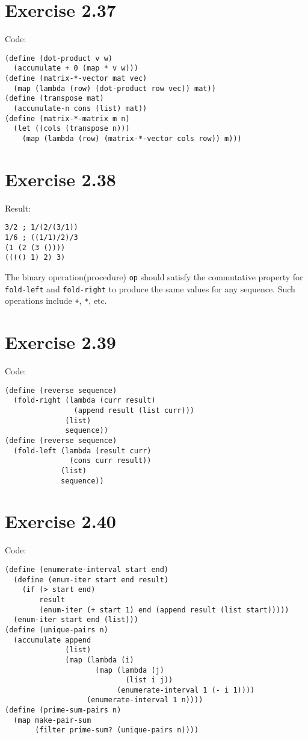 \documentclass[../main.tex]{subfiles}
\begin{document}
\section{Exercise 2.37}

Code:

\begin{lstlisting}
(define (dot-product v w)
  (accumulate + 0 (map * v w)))
(define (matrix-*-vector mat vec)
  (map (lambda (row) (dot-product row vec)) mat))
(define (transpose mat)
  (accumulate-n cons (list) mat))
(define (matrix-*-matrix m n)
  (let ((cols (transpose n)))
    (map (lambda (row) (matrix-*-vector cols row)) m)))
\end{lstlisting}

\section{Exercise 2.38}

Result:

\begin{lstlisting}
3/2 ; 1/(2/(3/1))
1/6 ; ((1/1)/2)/3
(1 (2 (3 ())))
(((() 1) 2) 3)
\end{lstlisting}

The binary operation(procedure) \lstinline{op}
 should satisfy the commutative property for
 \lstinline{fold-left} and \lstinline{fold-right}
 to produce the same values for any sequence. Such
 operations include \lstinline{+}, \lstinline{*},
 etc.

\section{Exercise 2.39}

Code:

\begin{lstlisting}
(define (reverse sequence)
  (fold-right (lambda (curr result)
                (append result (list curr)))
              (list)
              sequence))
(define (reverse sequence)
  (fold-left (lambda (result curr)
               (cons curr result))
             (list)
             sequence))
\end{lstlisting}

\section{Exercise 2.40}

Code:

\begin{lstlisting}
(define (enumerate-interval start end)
  (define (enum-iter start end result)
    (if (> start end)
        result
        (enum-iter (+ start 1) end (append result (list start)))))
  (enum-iter start end (list)))
(define (unique-pairs n)
  (accumulate append
              (list)
              (map (lambda (i)
                     (map (lambda (j)
                            (list i j))
                          (enumerate-interval 1 (- i 1))))
                   (enumerate-interval 1 n))))
(define (prime-sum-pairs n)
  (map make-pair-sum
       (filter prime-sum? (unique-pairs n))))
\end{lstlisting}
\end{document}
